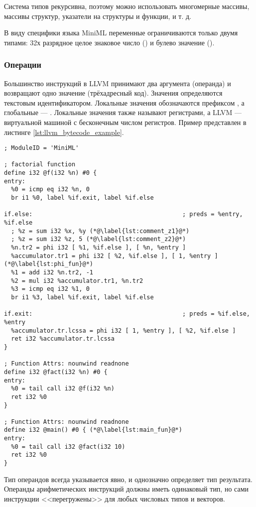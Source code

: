 Система типов рекурсивна, поэтому можно использовать многомерные массивы, массивы структур, указатели на структуры и функции, и т.
д.

В виду специфики языка MiniML переменные ограничиваются
только двумя типами: 32х разрядное целое знаковое число () и
булево значение ().

\subsubsection{Операции}

Большинство инструкций в LLVM принимают два аргумента (операнда) и возвращают одно значение (трёхадресный код). Значения
определяются текстовым идентификатором. Локальные значения обозначаются префиксом \icode{\%}, а глобальные — . Локальные значения также
называют регистрами, а LLVM — виртуальной машиной с бесконечным числом регистров. Пример
представлен в листинге \ref{lst:llvm_bytecode_example}.

\begin{lstlisting}[caption=Пример сгенерированного LLVM байткода
                  , label=lst:llvm_bytecode_example]
; ModuleID = 'MiniML'

; factorial function
define i32 @f(i32 %n) #0 {
entry:
  %0 = icmp eq i32 %n, 0
  br i1 %0, label %if.exit, label %if.else

if.else:                                          ; preds = %entry, %if.else
  ; %z = sum i32 %x, %y (*@\label{lst:comment_z1}@*)
  ; %z = sum i32 %z, 5 (*@\label{lst:comment_z2}@*)
  %n.tr2 = phi i32 [ %1, %if.else ], [ %n, %entry ]
  %accumulator.tr1 = phi i32 [ %2, %if.else ], [ 1, %entry ] (*@\label{lst:phi_fun}@*)
  %1 = add i32 %n.tr2, -1
  %2 = mul i32 %accumulator.tr1, %n.tr2
  %3 = icmp eq i32 %1, 0
  br i1 %3, label %if.exit, label %if.else

if.exit:                                          ; preds = %if.else, %entry
  %accumulator.tr.lcssa = phi i32 [ 1, %entry ], [ %2, %if.else ]
  ret i32 %accumulator.tr.lcssa
}

; Function Attrs: nounwind readnone
define i32 @fact(i32 %n) #0 {
entry:
  %0 = tail call i32 @f(i32 %n)
  ret i32 %0
}

; Function Attrs: nounwind readnone
define i32 @main() #0 { (*@\label{lst:main_fun}@*)
entry:
  %0 = tail call i32 @fact(i32 10)
  ret i32 %0
}
\end{lstlisting}

Тип операндов всегда указывается явно, и однозначно определяет тип результата.
Операнды арифметических инструкций должны иметь одинаковый тип, но сами инструкции <<перегружены>> для любых числовых типов и векторов.

